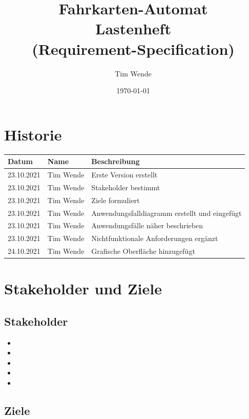 \documentclass{article}
\author{Tim Wende}
\date{\today}
\title{\textbf{Fahrkarten-Automat\\Lastenheft\\(Requirement-Specification)}}
\begin{document}
    \maketitle
    \tableofcontents
    \newpage
    \section{Historie}
    \begin{tabularx}{\textwidth}{|l|l|X|}
        \hline        
        \textbf{Datum} & \textbf{Name} & \textbf{Beschreibung}\\
        \hline
        23.10.2021 & Tim Wende & Erste Version erstellt \\\hline
        23.10.2021 & Tim Wende & \gls{Stakeholder} bestimmt \\\hline
        23.10.2021 & Tim Wende & Ziele formuliert \\\hline
        23.10.2021 & Tim Wende & Anwendungsfalldiagramm erstellt und eingefügt \\\hline
        23.10.2021 & Tim Wende & Anwendungsfälle näher beschrieben \\\hline
        23.10.2021 & Tim Wende & Nichtfunktionale Anforderungen ergänzt \\\hline
        24.10.2021 & Tim Wende & Grafische Oberfläche hinzugefügt \\\hline
    \end{tabularx}

    \section{Stakeholder und Ziele}
    \subsection{\gls{Stakeholder}}
    \begin{itemize}
        \setlength\itemsep{-0.25em}
        \item {}
        \item {}
        \item {}
        \item {}
        \item {}
    \end{itemize}

    \subsection{Ziele}
\end{document}

